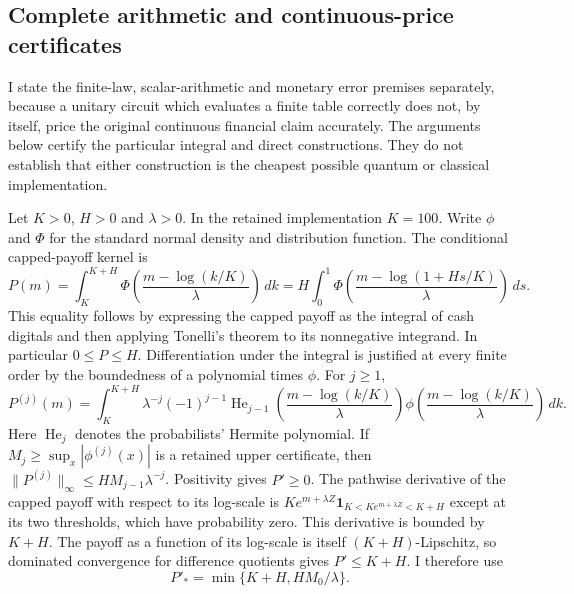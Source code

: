 \subsection{Complete arithmetic and continuous-price certificates}
\label{sec:integral-full-certificate}

I state the finite-law, scalar-arithmetic and monetary error premises separately,
because a unitary circuit which evaluates a finite table correctly does not,
by itself, price the original continuous financial claim accurately.  The
arguments below certify the particular integral and direct constructions.  They
do not establish that either construction is the cheapest possible quantum or
classical implementation.

Let $K>0$, $H>0$ and $\lambda>0$.  In the retained implementation $K=100$.
Write $\phi$ and $\Phi$ for the standard normal density and distribution
function.  The conditional capped-payoff kernel is
\begin{equation}
 P(m)=\int_K^{K+H}\Phi\!\left(\frac{m-\log(k/K)}{\lambda}\right)\,dk
     =H\int_0^1\Phi\!\left(\frac{m-\log(1+Hs/K)}{\lambda}\right)\,ds.
 \label{eq:iv-P-strike}
\end{equation}
This equality follows by expressing the capped payoff as the integral of cash
digitals and then applying Tonelli's theorem to its nonnegative integrand.
In particular $0\leq P\leq H$.  Differentiation under the integral is justified
at every finite order by the boundedness of a polynomial times $\phi$.
For $j\geq1$,
\begin{equation}
 P^{(j)}(m)=\int_K^{K+H}\lambda^{-j}(-1)^{j-1}
 \operatorname{He}_{j-1}\!\left(\frac{m-\log(k/K)}{\lambda}\right)
 \phi\!\left(\frac{m-\log(k/K)}{\lambda}\right)\,dk.
 \label{eq:iv-P-derivative}
\end{equation}
Here $\operatorname{He}_j$ denotes the probabilists' Hermite polynomial.
If $M_j\geq\sup_x|\phi^{(j)}(x)|$ is a retained upper certificate, then
$\|P^{(j)}\|_\infty\leq HM_{j-1}\lambda^{-j}$.  Positivity gives $P'\geq0$.
The pathwise derivative of the capped payoff with respect to its log-scale is
$Ke^{m+\lambda Z}\boldsymbol 1_{K<Ke^{m+\lambda Z}<K+H}$ except at its
two thresholds, which have probability zero.  This derivative is bounded by
$K+H$.  The payoff as a function of its log-scale is itself $(K+H)$-Lipschitz,
so dominated convergence for difference quotients gives $P'\leq K+H$.
I therefore use
\begin{equation}
 P'_* = \min\{K+H,HM_0/\lambda\}.
 \label{eq:iv-Pprime-bound}
\end{equation}

